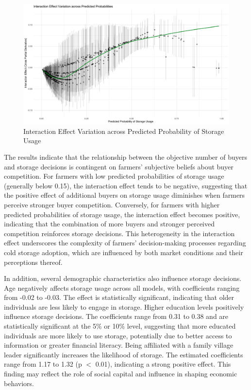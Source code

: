 \documentclass[12pt]{article}
\begin{document}
\begin{figure}[ht]
\centering
\includegraphics[width=1\textwidth]{figures/Interaction_Effect_across_Predicted Probabilities.png}
\caption{Interaction Effect Variation across Predicted Probability of Storage Usage}
\label{Figure: interaction effects}
\end{figure}

The results indicate that the relationship between the objective number of buyers and storage decisions is contingent on farmers' subjective beliefs about buyer competition. For farmers with low predicted probabilities of storage usage (generally below 0.15), the interaction effect tends to be negative, suggesting that the positive effect of additional buyers on storage usage diminishes when farmers perceive stronger buyer competition. Conversely, for farmers with higher predicted probabilities of storage usage, the interaction effect becomes positive, indicating that the combination of more buyers and stronger perceived competition reinforces storage decisions. This heterogeneity in the interaction effect underscores the complexity of farmers' decision-making processes regarding cold storage adoption, which are influenced by both market conditions and their perceptions thereof.

In addition, several demographic characteristics also influence storage decisions. Age negatively affects storage usage across all models, with coefficients ranging from -0.02 to -0.03. The effect is statistically significant, indicating that older individuals are less likely to engage in storage. Higher education levels positively influence storage decisions. The coefficients range from 0.31 to 0.38 and are statistically significant at the 5\% or 10\% level, suggesting that more educated individuals are more likely to use storage, potentially due to better access to information or greater financial literacy. Being affiliated with a family village leader significantly increases the likelihood of storage. The estimated coefficients range from 1.17 to 1.32 (p $<$ 0.01), indicating a strong positive effect. This finding may reflect the role of social capital and influence in shaping economic behaviors.
\end{document}
